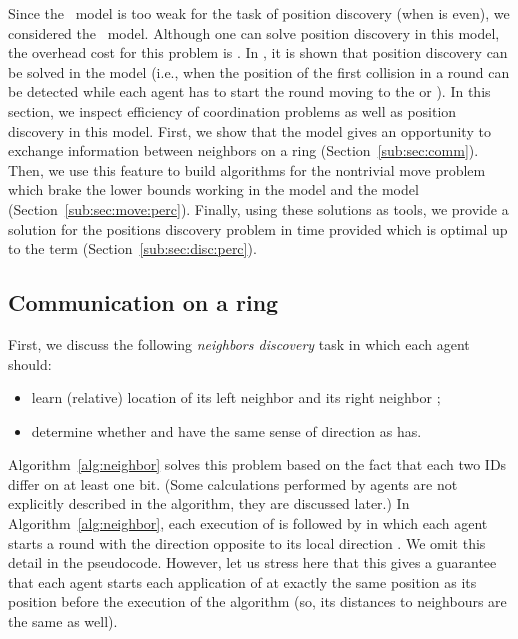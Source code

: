 Since the \basic\ model is too weak for the task of position discovery (when  is even),
we considered the \lazy\ model. Although one can solve position discovery in this model, the
overhead cost for this problem is .
In \cite{FriedetzkyGGM12}, it is shown that position discovery
can be solved in the {\perceptive} model (i.e., when the position
of the first collision in a round can be detected while each
agent has to start the round moving to the {\rright} or {\lleft}).
In this section, we inspect efficiency of coordination problems as well as position discovery in this model.
First, we show that the {\perceptive} model gives an opportunity to exchange information between neighbors
on a ring (Section~\ref{sub:sec:comm}). Then, we use this feature to build algorithms for the nontrivial move problem 
which brake the lower bounds working in the {\basic} model and the {\lazy} model (Section~\ref{sub:sec:move:perc}).
Finally, using these solutions as tools, we provide a solution for the positions discovery problem
in time  provided  which is optimal up to the  term (Section~\ref{sub:sec:disc:perc}).

\subsection{Communication on a ring}
First, we discuss the following {\em neighbors discovery} task in which
each agent  should:
\begin{itemize}
\item
\vspace{-5pt}
learn (relative) location of its left neighbor  and its right neighbor ;
\item
\vspace{-5pt}
determine whether  and  have the same sense of direction as  has.
\end{itemize}
\vspace{-5pt}
Algorithm~\ref{alg:neighbor} solves this problem based on the fact that each two
IDs differ on at least one bit. (Some calculations performed by agents are not
explicitly described in the algorithm, they are discussed later.)
In Algorithm~\ref{alg:neighbor}, each execution of {\SingleRound} is followed by {\ReversedRound} in which
each agent starts a round with the direction opposite to its local direction {\dir}. We omit this detail in the pseudocode. However, let us stress here that this gives a guarantee that each agent starts each application of {\SingleRound} at exactly the same position as its position before the execution of the
algorithm (so, its distances to neighbours are the same as well). 

